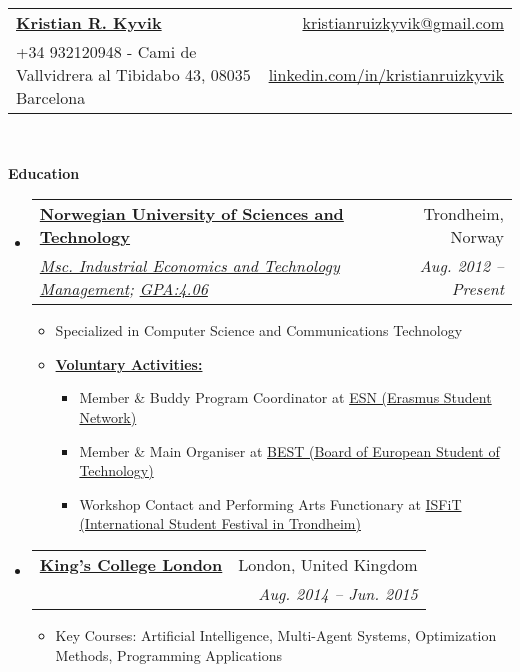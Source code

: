 \documentclass[letterpaper,11pt]{article}
\makeatletter
\newcommand{\resitem}[1]{\item #1 \vspace{-2pt}}
\newcommand{\resheading}[1]{{\large \colorbox{mygrey}{\begin{minipage}{\textwidth}{\textbf{#1 \vphantom{p\^{E}}}}\end{minipage}}}}
\newcommand{\ressubheading}[4]{
\begin{tabular*}{6.5in}{l@{\extracolsep{\fill}}r}
        \textbf{#1} & #2 \\
        \textit{#3} & \textit{#4} \\
\end{tabular*}\vspace{-6pt}}
\makeatother
\begin{document}
\newcommand{\mywebheader}{
\begin{tabular*}{7in}{l@{\extracolsep{\fill}}r}
    \textbf{\href{}{\LARGE Kristian R. Kyvik}} & \href{mailto:kristianruizkyvik@gmail.com}{kristianruizkyvik@gmail.com}\\
    {\footnotesize {+34 932120948 - Cami de Vallvidrera al Tibidabo 43, 08035 Barcelona}} & \href{http://www.linkedin.com/in/kristianruizkyvik}{linkedin.com/in/kristianruizkyvik} \\
    \end{tabular*}
\\
\vspace{0.1in}}

\mywebheader

\resheading{Education}
    \begin{itemize}
        \item
            \ressubheading{\href{http://www.ntnu.edu/}{Norwegian University of Sciences and Technology}}{Trondheim, Norway}{\href{http://www.ntnu.edu/studies/mtiot}{Msc. Industrial Economics and Technology Management}; \href{}{GPA:4.06}}{Aug. 2012 -- Present}
                { \footnotesize
                \begin{itemize}
                    \resitem{Specialized in Computer Science and Communications Technology}
                    \resitem{\textbf{\href{}{ Voluntary Activities:}}}
                        \begin{itemize}
                            \resitem{ Member \& Buddy Program Coordinator at {\href{http://www.trondheim.esn.no/}{ESN (Erasmus Student Network)}}}
                            \resitem{ Member \& Main Organiser at {\href{http://www.best.eu.org/index.jsp}{BEST (Board of European Student of Technology)}}}
                            \resitem{ Workshop Contact and Performing Arts Functionary at {\href{http://www.isfit.org/tabs/about-isfit}{ISFiT (International Student Festival in Trondheim)}}}
                        \end{itemize}
                \end{itemize}
                }
        \item
        \ressubheading{\href{http://www.kcl.ac.uk/index.aspx}{King's College London}}{London, United Kingdom}{\href{}{Exchange Year (during third year)}; \href{}}{Aug. 2014 -- Jun. 2015}
            { \footnotesize
            \begin{itemize}
                \resitem{Key Courses: Artificial Intelligence, Multi-Agent Systems, Optimization Methods, Programming Applications}

\end{itemize}}
\end{itemize}
\end{document}

